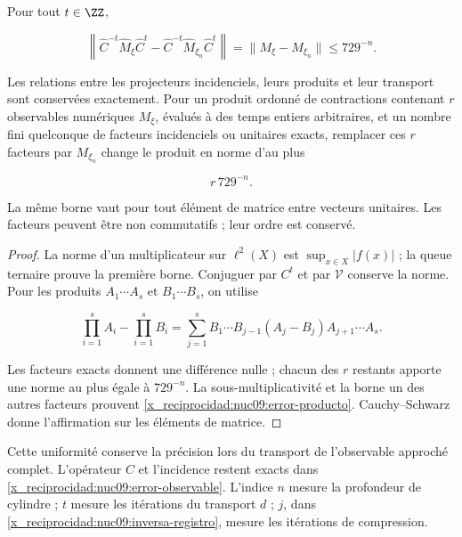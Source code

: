 \begin{theorem}
\label{x_reciprocidad:nuc09:precision}
Pour tout \(t\in\ZZ\),



\begin{equation}
\boxed{
\left\|\widehat C^{-t}\widehat M_\xi\widehat C^t
-\widehat C^{-t}\widehat M_{\xi_n}\widehat C^t\right\|
=\|M_\xi-M_{\xi_n}\|\le729^{-n}.}
\label{x_reciprocidad:nuc09:error-observable}
\end{equation}



Les relations entre les projecteurs incidenciels, leurs produits
et leur transport sont conservées exactement.
Pour un produit ordonné de contractions contenant \(r\)
observables numériques \(M_\xi\), évalués à des temps entiers
arbitraires, et un nombre fini quelconque de facteurs incidenciels
ou unitaires exacts, remplacer ces \(r\) facteurs par
\(M_{\xi_n}\) change le produit en norme d’au plus



\begin{equation}
\boxed{r\,729^{-n}.}
\label{x_reciprocidad:nuc09:error-producto}
\end{equation}



La même borne vaut pour tout élément de matrice entre vecteurs
unitaires. Les facteurs peuvent être non commutatifs ; leur ordre est conservé.
\end{theorem}

\begin{proof}
La norme d’un multiplicateur sur \(\ell^2(X)\) est
\(\sup_{x\in X}|f(x)|\) ; la queue ternaire prouve la première borne.
Conjuguer par \(C^t\) et par \(\mathcal V\) conserve la norme.
Pour les produits \(A_1\cdots A_s\) et \(B_1\cdots B_s\), on utilise



\[
\prod_{i=1}^s A_i-\prod_{i=1}^s B_i
=\sum_{j=1}^s B_1\cdots B_{j-1}(A_j-B_j)A_{j+1}\cdots A_s.
\]



Les facteurs exacts donnent une différence nulle ; chacun des \(r\)
restants apporte une norme au plus égale à \(729^{-n}\).
La sous-multiplicativité et la borne un des autres facteurs prouvent
\eqref{x_reciprocidad:nuc09:error-producto}.
Cauchy--Schwarz donne l’affirmation sur les éléments de matrice.
\end{proof}

Cette uniformité conserve la précision lors du transport de l’observable
approché complet. L’opérateur \(C\) et l’incidence restent
exacts dans \eqref{x_reciprocidad:nuc09:error-observable}.
L’indice \(n\) mesure la profondeur de cylindre ; \(t\) mesure les itérations
du transport \(d\) ; \(j\), dans \eqref{x_reciprocidad:nuc09:inversa-registro},
mesure les itérations de compression.

